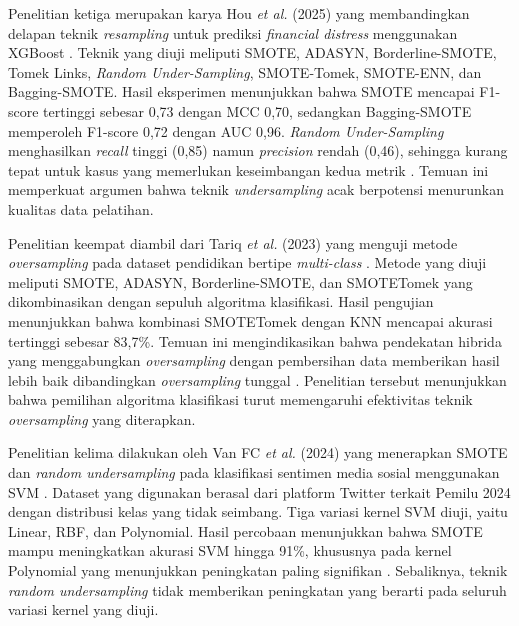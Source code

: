 Penelitian ketiga merupakan karya Hou \textit{et al.} (2025) yang membandingkan delapan teknik \textit{resampling} untuk prediksi \textit{financial distress} menggunakan XGBoost \cite{Hou2025XGBoost}. Teknik yang diuji meliputi SMOTE, ADASYN, Borderline-SMOTE, Tomek Links, \textit{Random Under-Sampling}, SMOTE-Tomek, SMOTE-ENN, dan Bagging-SMOTE. Hasil eksperimen menunjukkan bahwa SMOTE mencapai F1-score tertinggi sebesar 0,73 dengan MCC 0,70, sedangkan Bagging-SMOTE memperoleh F1-score 0,72 dengan AUC 0,96. \textit{Random Under-Sampling} menghasilkan \textit{recall} tinggi (0,85) namun \textit{precision} rendah (0,46), sehingga kurang tepat untuk kasus yang memerlukan keseimbangan kedua metrik \cite{Hou2025XGBoost}. Temuan ini memperkuat argumen bahwa teknik \textit{undersampling} acak berpotensi menurunkan kualitas data pelatihan.

Penelitian keempat diambil dari Tariq \textit{et al.} (2023) yang menguji metode \textit{oversampling} pada dataset pendidikan bertipe \textit{multi-class} \cite{Tariq2023Oversampling}. Metode yang diuji meliputi SMOTE, ADASYN, Borderline-SMOTE, dan SMOTETomek yang dikombinasikan dengan sepuluh algoritma klasifikasi. Hasil pengujian menunjukkan bahwa kombinasi SMOTETomek dengan KNN mencapai akurasi tertinggi sebesar 83,7\%. Temuan ini mengindikasikan bahwa pendekatan hibrida yang menggabungkan \textit{oversampling} dengan pembersihan data memberikan hasil lebih baik dibandingkan \textit{oversampling} tunggal \cite{Tariq2023Oversampling}. Penelitian tersebut menunjukkan bahwa pemilihan algoritma klasifikasi turut memengaruhi efektivitas teknik \textit{oversampling} yang diterapkan.

Penelitian kelima dilakukan oleh Van FC \textit{et al.} (2024) yang menerapkan SMOTE dan \textit{random undersampling} pada klasifikasi sentimen media sosial menggunakan SVM \cite{VanFC2024Enhancing}. Dataset yang digunakan berasal dari platform Twitter terkait Pemilu 2024 dengan distribusi kelas yang tidak seimbang. Tiga variasi kernel SVM diuji, yaitu Linear, RBF, dan Polynomial. Hasil percobaan menunjukkan bahwa SMOTE mampu meningkatkan akurasi SVM hingga 91\%, khususnya pada kernel Polynomial yang menunjukkan peningkatan paling signifikan \cite{VanFC2024Enhancing}. Sebaliknya, teknik \textit{random undersampling} tidak memberikan peningkatan yang berarti pada seluruh variasi kernel yang diuji.

